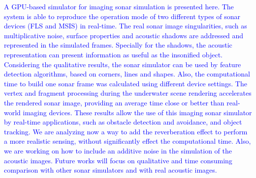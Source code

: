 \documentclass[final,5p,times]{elsarticle}
\begin{document}
\textcolor{blue}{A GPU-based simulator for imaging sonar simulation is presented here. The system is able to reproduce the operation mode of two different types of sonar devices (FLS and MSIS) in real-time. The real sonar image singularities, such as multiplicative noise, surface properties and acoustic shadows are addressed and represented in the simulated frames. Specially for the shadows, the acoustic representation can present information as useful as the insonified object. Considering the qualitative results, the sonar simulator can be used by feature detection algorithms, based on corners, lines and shapes. Also, the computational time to build one sonar frame was calculated using different device settings. The vertex and fragment processing during the underwater scene rendering accelerates the rendered sonar image, providing an average time close or better than real-world imaging devices. These results allow the use of this imaging sonar simulator by real-time applications, such as obstacle detection and avoidance, and object tracking. We are analyzing now a way to add the reverberation effect to perform a more realistic sensing, without significantly effect the computational time. Also, we are working on how to include an additive noise in the simulation of the acoustic images. Future works will focus on qualitative and time consuming comparison with other sonar simulators and with real acoustic images.}










\end{document}
